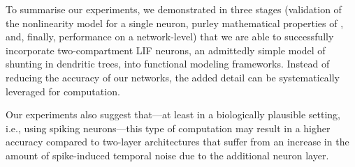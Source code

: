 To summarise our experiments, we demonstrated in three stages (validation of the nonlinearity model \Hcond for a single neuron, purley mathematical properties of \Hcond, and, finally, performance on a network-level) that we are able to successfully incorporate two-compartment LIF neurons, an admittedly simple model of shunting in dendritic trees, into functional modeling frameworks.
Instead of reducing the accuracy of our networks, the added detail can be systematically leveraged for computation.

Our experiments also suggest that---at least in a biologically plausible setting, i.e., using spiking neurons---this type of computation may result in a higher accuracy compared to two-layer architectures that suffer from an increase in the amount of spike-induced temporal noise due to the additional neuron layer.

